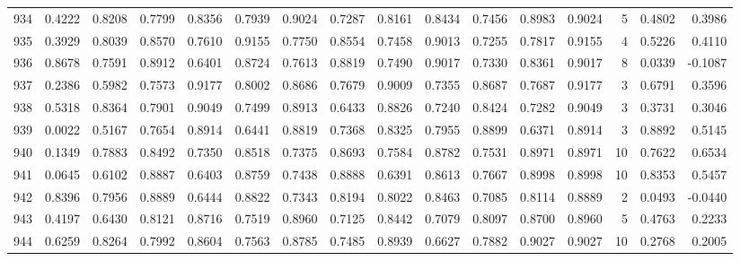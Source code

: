 \begin{tabular}{lrrrrrrrrrrrrrrr}
934 &      0.4222 &  0.8208 &  0.7799 &  0.8356 &  0.7939 &  0.9024 &  0.7287 &  0.8161 &  0.8434 &  0.7456 &   0.8983 &     0.9024 &      5 &                    0.4802 &                     0.3986 \\
935 &      0.3929 &  0.8039 &  0.8570 &  0.7610 &  0.9155 &  0.7750 &  0.8554 &  0.7458 &  0.9013 &  0.7255 &   0.7817 &     0.9155 &      4 &                    0.5226 &                     0.4110 \\
936 &      0.8678 &  0.7591 &  0.8912 &  0.6401 &  0.8724 &  0.7613 &  0.8819 &  0.7490 &  0.9017 &  0.7330 &   0.8361 &     0.9017 &      8 &                    0.0339 &                    -0.1087 \\
937 &      0.2386 &  0.5982 &  0.7573 &  0.9177 &  0.8002 &  0.8686 &  0.7679 &  0.9009 &  0.7355 &  0.8687 &   0.7687 &     0.9177 &      3 &                    0.6791 &                     0.3596 \\
938 &      0.5318 &  0.8364 &  0.7901 &  0.9049 &  0.7499 &  0.8913 &  0.6433 &  0.8826 &  0.7240 &  0.8424 &   0.7282 &     0.9049 &      3 &                    0.3731 &                     0.3046 \\
939 &      0.0022 &  0.5167 &  0.7654 &  0.8914 &  0.6441 &  0.8819 &  0.7368 &  0.8325 &  0.7955 &  0.8899 &   0.6371 &     0.8914 &      3 &                    0.8892 &                     0.5145 \\
940 &      0.1349 &  0.7883 &  0.8492 &  0.7350 &  0.8518 &  0.7375 &  0.8693 &  0.7584 &  0.8782 &  0.7531 &   0.8971 &     0.8971 &     10 &                    0.7622 &                     0.6534 \\
941 &      0.0645 &  0.6102 &  0.8887 &  0.6403 &  0.8759 &  0.7438 &  0.8888 &  0.6391 &  0.8613 &  0.7667 &   0.8998 &     0.8998 &     10 &                    0.8353 &                     0.5457 \\
942 &      0.8396 &  0.7956 &  0.8889 &  0.6444 &  0.8822 &  0.7343 &  0.8194 &  0.8022 &  0.8463 &  0.7085 &   0.8114 &     0.8889 &      2 &                    0.0493 &                    -0.0440 \\
943 &      0.4197 &  0.6430 &  0.8121 &  0.8716 &  0.7519 &  0.8960 &  0.7125 &  0.8442 &  0.7079 &  0.8097 &   0.8700 &     0.8960 &      5 &                    0.4763 &                     0.2233 \\
944 &      0.6259 &  0.8264 &  0.7992 &  0.8604 &  0.7563 &  0.8785 &  0.7485 &  0.8939 &  0.6627 &  0.7882 &   0.9027 &     0.9027 &     10 &                    0.2768 &                     0.2005 \\

\end{tabular}
